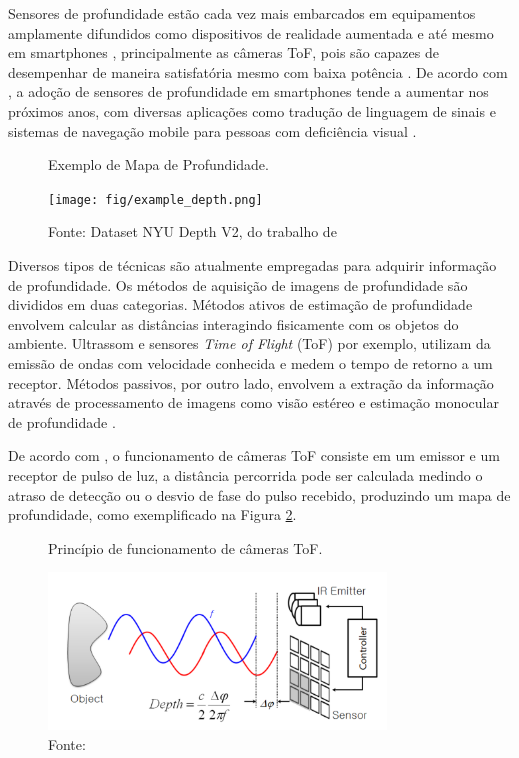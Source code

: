 Sensores de profundidade estão cada vez mais embarcados em equipamentos amplamente difundidos como dispositivos de realidade aumentada e até mesmo em smartphones \cite{du2020depthlab}, principalmente as câmeras ToF, pois são capazes de desempenhar de maneira satisfatória mesmo com baixa potência \cite{branscombe2018microsoft}. De acordo com \cite{xie2021ultradepth}, a adoção de sensores de profundidade em smartphones tende a aumentar nos próximos anos, com diversas aplicações como tradução de linguagem de sinais \cite{park2021enabling} e sistemas de navegação mobile para pessoas com deficiência visual \cite{see2022smartphone}. 

\begin{figure}[h]
    \centering   
    \caption{Exemplo de Mapa de Profundidade.}
    \texttt{[image: fig/example\_depth.png]}
    \caption*{Fonte: Dataset NYU Depth V2, do trabalho de }
    \label{fig:depthmap}
\end{figure}





Diversos tipos de técnicas são atualmente empregadas para adquirir informação de profundidade. Os métodos de aquisição de imagens de profundidade são divididos em duas categorias. Métodos ativos de estimação de profundidade envolvem calcular as distâncias interagindo fisicamente com os objetos do ambiente. Ultrassom e sensores \textit{Time of Flight} (ToF) por exemplo, utilizam da emissão de ondas com velocidade conhecida e medem o tempo de retorno a um receptor. Métodos passivos, por outro lado, envolvem a extração da informação através de processamento de imagens como visão estéreo e estimação monocular de profundidade \cite{khan2020deep}. 

De acordo com , o funcionamento de câmeras ToF consiste em um emissor e um receptor de pulso de luz, a distância percorrida pode ser calculada medindo o atraso de detecção ou o desvio de fase do pulso recebido, produzindo um mapa de profundidade, como exemplificado na Figura \ref{fig:tof}. 

\begin{figure}[h]
    \centering   
    \caption{Princípio de funcionamento de câmeras ToF.}
    \includegraphics[width=0.8\textwidth]{fig/tof_cameras.png}
    \caption*{Fonte: \cite{hansard2012time}}
    \label{fig:tof}
\end{figure}

